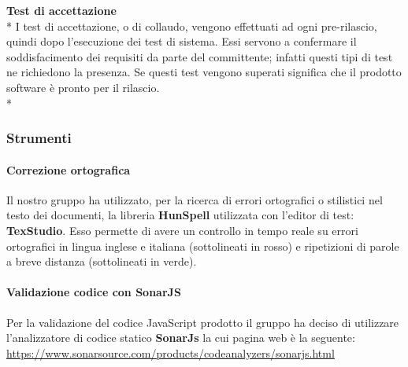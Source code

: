 \textbf{Test di accettazione} \\*
I test di accettazione, o di collaudo, vengono effettuati ad ogni pre-rilascio, quindi dopo l'esecuzione dei test di sistema. Essi servono a confermare il soddisfacimento dei requisiti da parte del committente; infatti questi tipi di test ne richiedono la presenza. Se questi test vengono superati significa che il prodotto software è pronto per il rilascio. \\*
\subsubsection{Strumenti}
	\paragraph{Correzione ortografica}
	Il nostro gruppo ha utilizzato, per la ricerca di errori ortografici o stilistici nel testo dei documenti, la libreria \textbf{HunSpell} utilizzata con l'editor di test: \textbf{TexStudio}. Esso permette di avere un controllo in tempo reale su errori ortografici in lingua inglese e italiana (sottolineati in rosso) e ripetizioni di parole a breve distanza (sottolineati in verde).
	\paragraph{Validazione codice con SonarJS}
	Per la validazione del codice JavaScript prodotto il gruppo ha deciso di utilizzare l'analizzatore di codice statico \textbf{SonarJs} la cui pagina web è la seguente: \\ \url{https://www.sonarsource.com/products/codeanalyzers/sonarjs.html}
